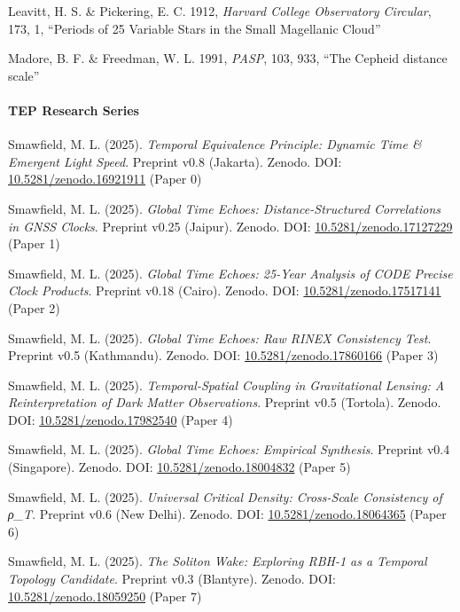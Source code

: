 \documentclass[
]{article}
\begin{document}
Leavitt, H. S. \& Pickering, E. C. 1912, \emph{Harvard College
Observatory Circular}, 173, 1, ``Periods of 25 Variable Stars in the
Small Magellanic Cloud''

Madore, B. F. \& Freedman, W. L. 1991, \emph{PASP}, 103, 933, ``The
Cepheid distance scale''

\paragraph{TEP Research Series}\label{tep-research-series}

Smawfield, M. L. (2025). \emph{Temporal Equivalence Principle: Dynamic
Time \& Emergent Light Speed}. Preprint v0.8 (Jakarta). Zenodo. DOI:
\href{https://doi.org/10.5281/zenodo.16921911}{10.5281/zenodo.16921911}
(Paper 0)

Smawfield, M. L. (2025). \emph{Global Time Echoes: Distance-Structured
Correlations in GNSS Clocks}. Preprint v0.25 (Jaipur). Zenodo. DOI:
\href{https://doi.org/10.5281/zenodo.17127229}{10.5281/zenodo.17127229}
(Paper 1)

Smawfield, M. L. (2025). \emph{Global Time Echoes: 25-Year Analysis of
CODE Precise Clock Products}. Preprint v0.18 (Cairo). Zenodo. DOI:
\href{https://doi.org/10.5281/zenodo.17517141}{10.5281/zenodo.17517141}
(Paper 2)

Smawfield, M. L. (2025). \emph{Global Time Echoes: Raw RINEX Consistency
Test}. Preprint v0.5 (Kathmandu). Zenodo. DOI:
\href{https://doi.org/10.5281/zenodo.17860166}{10.5281/zenodo.17860166}
(Paper 3)

Smawfield, M. L. (2025). \emph{Temporal-Spatial Coupling in
Gravitational Lensing: A Reinterpretation of Dark Matter Observations}.
Preprint v0.5 (Tortola). Zenodo. DOI:
\href{https://doi.org/10.5281/zenodo.17982540}{10.5281/zenodo.17982540}
(Paper 4)

Smawfield, M. L. (2025). \emph{Global Time Echoes: Empirical Synthesis}.
Preprint v0.4 (Singapore). Zenodo. DOI:
\href{https://doi.org/10.5281/zenodo.18004832}{10.5281/zenodo.18004832}
(Paper 5)

Smawfield, M. L. (2025). \emph{Universal Critical Density: Cross-Scale
Consistency of ρ\_T}. Preprint v0.6 (New Delhi). Zenodo. DOI:
\href{https://doi.org/10.5281/zenodo.18064365}{10.5281/zenodo.18064365}
(Paper 6)

Smawfield, M. L. (2025). \emph{The Soliton Wake: Exploring RBH-1 as a
Temporal Topology Candidate}. Preprint v0.3 (Blantyre). Zenodo. DOI:
\href{https://doi.org/10.5281/zenodo.18059250}{10.5281/zenodo.18059250}
(Paper 7)
\end{document}
